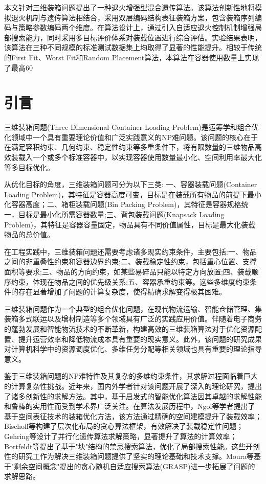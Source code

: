 \documentclass[UTF8]{ctexart}
\begin{document}
本文针对三维装箱问题提出了一种退火增强型混合遗传算法。该算法创新性地将模拟退火机制与遗传算法相结合，采用双层编码结构表征装箱方案，包含装箱序列编码与策略参数编码两个维度。在算法设计上，通过引入自适应退火控制机制增强局部搜索能力，同时采用多目标评价体系对装载位置进行综合评估。实验结果表明，该算法在三种不同规模的标准测试数据集上均取得了显著的性能提升。相较于传统的First Fit、Worst Fit和Random Placement算法，本算法在容器使用数量上实现了最高60%

\section{引言}

三维装箱问题(Three Dimensional Container Loading Problem)是运筹学和组合优化领域中一个具有重要理论价值和广泛实践意义的NP难问题。该问题的核心在于在满足容积约束、几何约束、稳定性约束等多重条件下，将有限数量的三维物品高效装载入一个或多个标准容器中，以实现容器使用数量最小化、空间利用率最大化等多目标优化。

从优化目标的角度，三维装箱问题可分为以下三类: 一、容器装载问题(Container Loading Problem)，其特征是容器高度可变，目标是在装载所有物品的前提下最小化容器高度；二、箱柜装载问题(Bin Packing Problem)，其特征是容器规格统一，目标是最小化所需容器数量;三、背包装载问题(Knapsack Loading Problem)，其特征是容器容量固定，物品具有不同价值属性，目标是最大化装载物品的总价值。

在工程实践中，三维装箱问题还需要考虑诸多现实约束条件，主要包括:一、物品之间的非重叠性约束和容器边界约束;二、装载稳定性约束，包括重心位置、支撑面积等要求;三、物品的方向约束，如某些易碎品只能以特定方向放置;四、装载顺序约束，体现在物品之间的优先级关系;五、容器承重约束等。这些多维度约束条件的存在显著增加了问题的计算复杂度，使得精确求解变得极其困难。

三维装箱问题作为一个典型的组合优化问题，在现代物流运输、智能仓储管理、集装箱多式联运以及增材制造等多个领域具有广泛的实践应用价值。伴随着电子商务的蓬勃发展和智能物流技术的不断革新，构建高效的三维装箱算法对于优化资源配置、提升运营效率和降低物流成本具有重要的现实意义。此外，该问题的研究成果对计算机科学中的资源调度优化、多维任务分配等相关领域也具有重要的理论指导意义。

鉴于三维装箱问题的NP难特性及其复杂的多维约束条件，其求解过程面临着巨大的计算复杂性挑战。近年来，国内外学者针对该问题开展了深入的理论研究，提出了诸多创新性的求解方法。其中，基于启发式的智能优化算法因其卓越的求解性能和鲁棒的实用性而受到学术界广泛关注。在算法发展历程中，Ngoi等学者提出了基于空间表征技术的装箱优化方法，该方法通过精确的空间建模提升了装载效率；Bischoff等构建了层次化布局的贪心算法框架，有效解决了装载稳定性问题；Gehring等设计了并行化遗传算法求解策略，显著提升了算法的计算效率；Bortfeldt等提出了基于"块"结构的禁忌搜索算法，优化了局部搜索性能。这些开创性的研究工作为解决三维装箱问题提供了坚实的理论基础和技术支撑。Moura等基于"剩余空间概念"提出的贪心随机自适应搜索算法(GRASP)进一步拓展了问题的求解思路。
\end{document}
